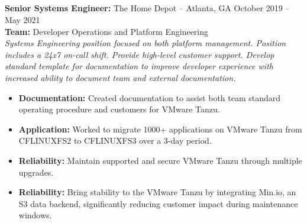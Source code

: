 \documentclass[11pt]{article}       %
\begin{document}
\subsection*{}
\textbf{Senior Systems Engineer:} {The Home Depot} -- Atlanta, GA \hfill October 2019 -- May 2021 \\
\vspace{4pt}
\textbf{Team:} Developer Operations and Platform Engineering \\
\vspace{4pt}
\textit{Systems Engineering position focused on both platform management. Position includes a 24x7 on-call shift. Provide high-level customer support. Develop standard template for documentation to improve developer experience with increased ability to document team and external documentation.} \\
\vspace{-6.5pt}
\begin{itemize}
  \item \textbf{Documentation:} Created documentation to assist both team standard operating procedure and customers for VMware Tanzu.
  \item \textbf{Application:} Worked to migrate 1000+ applications on VMware Tanzu from CFLINUXFS2 to CFLINUXFS3 over a 3-day period.
  \item \textbf{Reliability:} Maintain supported and secure VMware Tanzu through multiple upgrades.
  \item \textbf{Reliability:} Bring stability to the VMware Tanzu by integrating Min.io, an S3 data backend, significantly reducing customer impact during maintenance windows. 
\end{itemize}
\end{document}
